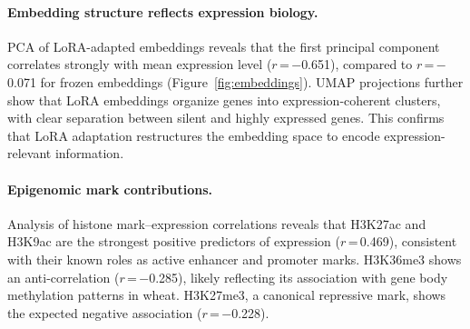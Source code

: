 \begin{methods}
\paragraph{Embedding structure reflects expression biology.}
PCA of LoRA-adapted embeddings reveals that the first principal component correlates strongly with mean expression level ($r$\,=\,$-$0.651), compared to $r$\,=\,$-$0.071 for frozen embeddings (Figure~\ref{fig:embeddings}). UMAP projections further show that LoRA embeddings organize genes into expression-coherent clusters, with clear separation between silent and highly expressed genes. This confirms that LoRA adaptation restructures the embedding space to encode expression-relevant information.

\paragraph{Epigenomic mark contributions.}
Analysis of histone mark--expression correlations reveals that H3K27ac and H3K9ac are the strongest positive predictors of expression ($r$\,=\,0.469), consistent with their known roles as active enhancer and promoter marks. H3K36me3 shows an anti-correlation ($r$\,=\,$-$0.285), likely reflecting its association with gene body methylation patterns in wheat. H3K27me3, a canonical repressive mark, shows the expected negative association ($r$\,=\,$-$0.228).

\begin{table}[!t]
\end{table}


\end{methods}
